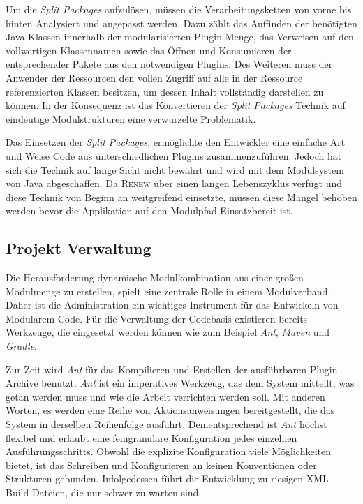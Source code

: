 		Um die \textit{Split Packages} aufzulösen, müssen die Verarbeitungsketten von vorne bis hinten Analysiert und angepasst werden. Dazu zählt das Auffinden der benötigten Java Klassen innerhalb der modularisierten Plugin Menge, das Verweisen auf den vollwertigen Klassennamen sowie das Öffnen und Konsumieren der entsprechender Pakete aus den notwendigen Plugins. Des Weiteren muss der Anwender der Ressourcen den vollen Zugriff auf alle in der Ressource referenzierten Klassen besitzen, um dessen Inhalt vollständig darstellen zu können. In der Konsequenz ist das Konvertieren der \textit{Split Packages} Technik auf eindeutige Modulstrukturen eine verwurzelte Problematik. \bigbreak

		Das Einsetzen der \textit{Split Packages}, ermöglichte den Entwickler eine einfache Art und Weise Code aus unterschiedlichen Plugins zusammenzuführen. Jedoch hat sich die Technik auf lange Sicht nicht bewährt und wird mit dem Modulsystem von Java abgeschaffen. Da \textsc{Renew} über einen langen Lebenszyklus verfügt und diese Technik von Beginn an weitgreifend einsetzte, müssen diese Mängel behoben werden bevor die Applikation auf den Modulpfad Einsatzbereit ist. 

	\subsection{Projekt Verwaltung} \label{sub:verwaltung} %
		Die Herausforderung dynamische Modulkombination aus einer großen Modulmenge zu erstellen, spielt eine zentrale Rolle in einem Modulverband. Daher ist die Administration ein wichtiges Instrument für das Entwickeln von Modularem Code.\newline
		Für die Verwaltung der Codebasis existieren bereits Werkzeuge, die eingesetzt werden können wie zum Beispiel \textit{Ant}, \textit{Maven} und \textit{Gradle}. \bigbreak

		Zur Zeit wird \textit{Ant} für das Kompilieren und Erstellen der ausführbaren Plugin Archive benutzt. \textit{Ant} ist ein imperatives Werkzeug, das dem System mitteilt, was getan werden muss und wie die Arbeit verrichten werden soll. Mit anderen Worten, es werden eine Reihe von Aktionsanweisungen bereitgestellt, die das System in derselben Reihenfolge ausführt. Dementsprechend ist \textit{Ant} höchst flexibel und erlaubt eine feingranulare Konfiguration jedes einzelnen Ausführungsschritts.\newline 
		Obwohl die explizite Konfiguration viele Möglichkeiten bietet, ist das Schreiben und Konfigurieren an keinen Konventionen oder Strukturen gebunden. Infolgedessen führt die Entwicklung zu riesigen XML-Build-Dateien, die nur schwer zu warten sind.\bigbreak


